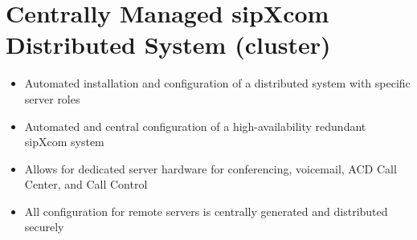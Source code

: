 \documentclass[letterpaper,10pt,english]{sphinxmanual}
\begin{document}
\section{Centrally Managed sipXcom Distributed System (cluster)}
\label{\detokenize{features:centrally-managed-sipxcom-distributed-system-cluster}}\begin{itemize}
\item {} 
Automated installation and configuration of a distributed system with specific server roles

\item {} 
Automated and central configuration of a high-availability redundant sipXcom system

\item {} 
Allows for dedicated server hardware for conferencing, voicemail, ACD Call Center, and Call Control

\item {} 
All configuration for remote servers is centrally generated and distributed securely

\end{itemize}
\end{document}
